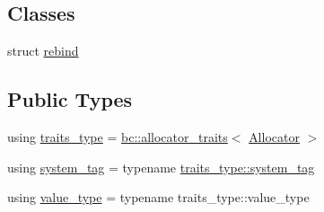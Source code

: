 \subsection*{Classes}
\begin{DoxyCompactItemize}
\item 
struct \hyperlink{structbc_1_1allocators_1_1pa__detail_1_1Derived__Allocator_1_1rebind}{rebind}
\end{DoxyCompactItemize}
\subsection*{Public Types}
\begin{DoxyCompactItemize}
\item 
using \hyperlink{structbc_1_1allocators_1_1pa__detail_1_1Derived__Allocator_a99adbba950946cb42cb6f2ad3e18d9ca}{traits\+\_\+type} = \hyperlink{structbc_1_1allocators_1_1allocator__traits}{bc\+::allocator\+\_\+traits}$<$ \hyperlink{classbc_1_1allocators_1_1Allocator}{Allocator} $>$
\item 
using \hyperlink{structbc_1_1allocators_1_1pa__detail_1_1Derived__Allocator_a42f99505929fa39c067d186f5f623045}{system\+\_\+tag} = typename \hyperlink{structbc_1_1allocators_1_1allocator__traits_a527cf77071c45a9dcc2c8213f65f37b3}{traits\+\_\+type\+::system\+\_\+tag}
\item 
using \hyperlink{structbc_1_1allocators_1_1pa__detail_1_1Derived__Allocator_a997c60e64ca7028da4c9eb15b5bf553d}{value\+\_\+type} = typename traits\+\_\+type\+::value\+\_\+type
\end{DoxyCompactItemize}
